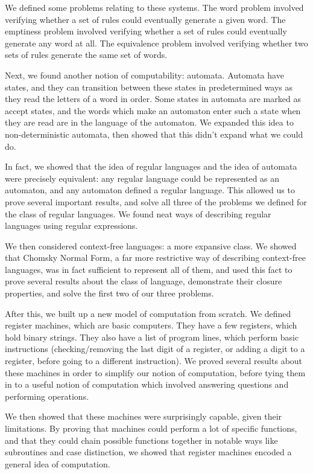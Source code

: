 \documentclass{article}
\begin{document}
We defined some problems relating to these systems. The word problem involved verifying whether a set of rules could eventually generate a given word. The emptiness problem involved verifying whether a set of rules could eventually generate any word at all. The equivalence problem involved verifying whether two sets of rules generate the same set of words.

Next, we found another notion of computability: automata. Automata have {states}, and they can transition between these states in predetermined ways as they read the letters of a word in order. Some states in automata are marked as {accept} states, and the words which make an automaton enter such a state when they are read are in the language of the automaton. We expanded this idea to non-deterministic automata, then showed that this didn't expand what we could do.

In fact, we showed that the idea of regular languages and the idea of automata were precisely equivalent: any regular language could be represented as an automaton, and any automaton defined a regular language. This allowed us to prove several important results, and solve all three of the problems we defined for the class of regular languages. We found neat ways of describing regular languages using {regular expressions}.

We then considered context-free languages: a more expansive class. We showed that Chomsky Normal Form, a far more restrictive way of describing context-free languages, was in fact sufficient to represent all of them, and used this fact to prove several results about the class of language, demonstrate their closure properties, and  solve the first two of our three problems.

After this, we built up a new model of computation from scratch. We defined register machines, which are basic computers. They have a few registers, which hold binary strings. They also have a list of program lines, which perform basic instructions (checking/removing the last digit of a register, or adding a digit to a register, before going to a different instruction). We proved several results about these machines in order to simplify our notion of computation, before tying them in to a useful notion of computation which involved answering questions and performing operations.

We then showed that these machines were surprisingly capable, given their limitations. By proving that machines could perform a lot of specific functions, and that they could chain possible functions together in notable ways like subroutines and case distinction, we showed that register machines encoded a general idea of computation.
\end{document}
